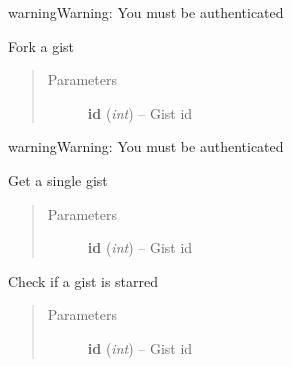 \documentclass[letterpaper,10pt,english]{sphinxmanual}
\begin{document}
\begin{fulllineitems}
\begin{fulllineitems}
\begin{quote}
\begin{description}
\end{description}\end{quote}

\begin{notice}{warning}{Warning:}
You must be authenticated
\end{notice}

\end{fulllineitems}


\begin{fulllineitems}
\label{gists:pygithub3.services.gists.Gist.fork}
Fork a gist
\begin{quote}\begin{description}
\item[{Parameters}] \leavevmode
\textbf{id} (\emph{int}) -- Gist id

\end{description}\end{quote}

\begin{notice}{warning}{Warning:}
You must be authenticated
\end{notice}

\end{fulllineitems}


\begin{fulllineitems}
\label{gists:pygithub3.services.gists.Gist.get}
Get a single gist
\begin{quote}\begin{description}
\item[{Parameters}] \leavevmode
\textbf{id} (\emph{int}) -- Gist id

\end{description}\end{quote}

\end{fulllineitems}


\begin{fulllineitems}
\label{gists:pygithub3.services.gists.Gist.is_starred}
Check if a gist is starred
\begin{quote}\begin{description}
\item[{Parameters}] \leavevmode
\textbf{id} (\emph{int}) -- Gist id


\end{description}
\end{quote}
\end{fulllineitems}
\end{fulllineitems}
\end{document}
